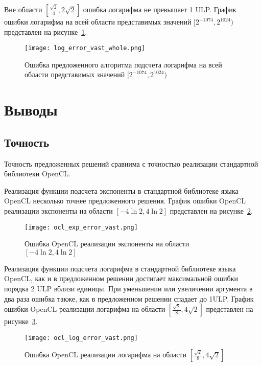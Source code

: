 Вне области $[\frac{\sqrt{2}}{4}, 2\sqrt{2}]$ ошибка логарифма не превышает 1 ULP.
График ошибки логарифма на всей области представимых значений $[2^{-1074}, 2^{1024})$ представлен на рисунке~\ref{plot:log:whole}.

\begin{figure}[hbt]
    \centering
    \texttt{[image: log\_error\_vast\_whole.png]}
    \caption{Ошибка предложенного алгоритма подсчета логарифма на всей области представимых значений $[2^{-1074}, 2^{1024})$}
    \label{plot:log:whole}
\end{figure}


\section{Выводы}

\subsection{Точность}

Точность предложенных решений сравнима с точностью реализации стандартной библиотеки OpenCL.

Реализация функции подсчета экспоненты в стандартной библиотеке языка OpenCL несколько точнее предложенного решения.
График ошибки OpenCL реализации экспоненты на области $[-4\ln{2}, 4\ln{2}]$ представлен на рисунке~\ref{plot:ocl_exp:small}.


\begin{figure}[hbt]
    \centering
    \texttt{[image: ocl\_exp\_error\_vast.png]}
    \caption{Ошибка OpenCL реализации экспоненты на области $[-4\ln{2}, 4\ln{2}]$}
    \label{plot:ocl_exp:small}
\end{figure}

Реализация функции подсчета логарифма в стандартной библиотеке языка OpenCL, как и в предложенном решении достигает максимальной ошибки порядка 2 ULP вблизи единицы.
При уменьшении или увеличении аргумента в два раза ошибка также, как в предложенном решении спадает до 1ULP.
График ошибки OpenCL реализации логарифма на области $[\frac{\sqrt{2}}{8}, 4\sqrt{2}]$ представлен на рисунке~\ref{plot:ocl_log:small}.


\begin{figure}[hbt]
    \centering
    \texttt{[image: ocl\_log\_error\_vast.png]}
    \caption{Ошибка OpenCL реализации логарифма на области $[\frac{\sqrt{2}}{8}, 4\sqrt{2}]$}
    \label{plot:ocl_log:small}
\end{figure}

